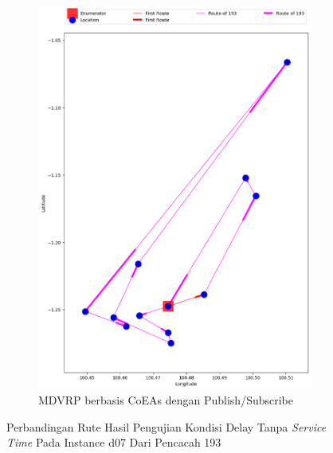 \begin{figure}[H]\ContinuedFloat
	\centering
	\begin{subfigure}[t]{\textwidth}
		\centering
		\includegraphics[width=\textwidth]{Resources/Images/delayed_7/real_m15_n100_delayed_7_193_pubsub_coes}
		\caption{MDVRP berbasis CoEAs dengan Publish/Subscribe}
		\label{fig:real_m15_n100_delayed_7_193_pubsub_coes}
	\end{subfigure}
	\caption{Perbandingan Rute Hasil Pengujian Kondisi Delay Tanpa \textit{Service Time} Pada Instance d07 Dari Pencacah 193}
	\label{fig:real_m15_n100_delayed_7_193_contd}
\end{figure}


